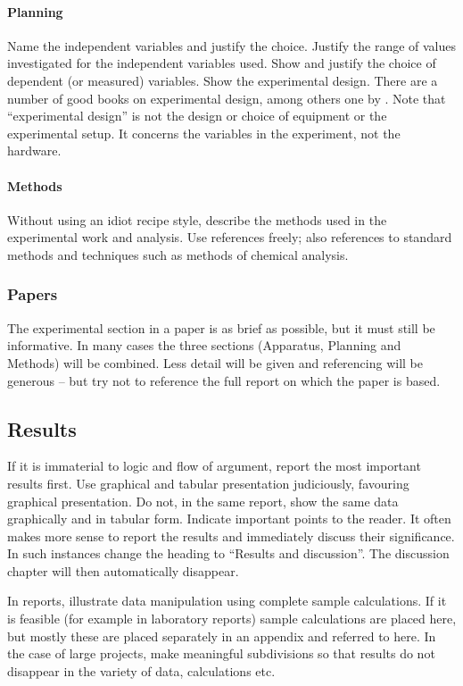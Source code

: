 \documentclass[a5paper, 10pt]{article}
\begin{document}
\paragraph{Planning}
Name the independent variables and justify the choice.  Justify the
range of values investigated for the independent variables used.  Show
and justify the choice of dependent (or measured) variables.  Show the
experimental design.  There are a number of good books on experimental
design, among others one by \citet{hicks}.  Note that
``experimental design'' is not the design or choice of equipment or
the experimental setup.  It concerns the variables in the experiment,
not the hardware.

\paragraph{Methods}
Without using an idiot recipe style, describe the methods used in the
experimental work and analysis.  Use references freely; also
references to standard methods and techniques such as methods of
chemical analysis.

\subsubsection{Papers}
The experimental section in a paper is as brief as possible, but it
must still be informative.  In many cases the three sections
(Apparatus, Planning and Methods) will be combined.  Less detail will
be given and referencing will be generous -- but try not to reference
the full report on which the paper is based.

\subsection{Results}
\label{sec:results}
If it is immaterial to logic and flow of argument, report the most
important results first.  Use graphical and tabular presentation
judiciously, favouring graphical presentation.  Do not, in the same
report, show the same data graphically and in tabular form.  Indicate
important points to the reader.  It often makes more sense to report
the results and immediately discuss their significance.  In such
instances change the heading to ``Results and discussion''. The
discussion chapter will then automatically disappear.

In reports, illustrate data manipulation using complete sample
calculations.  If it is feasible (for example in laboratory reports)
sample calculations are placed here, but mostly these are placed
separately in an appendix and referred to here.  In the case of large
projects, make meaningful subdivisions so that results do not
disappear in the variety of data, calculations etc.
\end{document}
